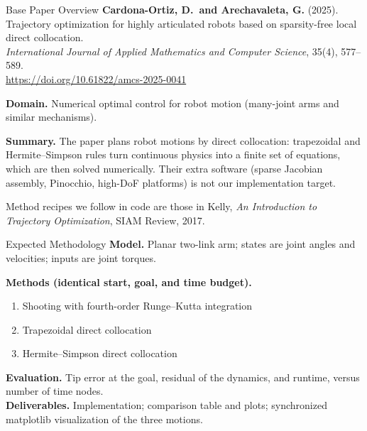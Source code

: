 \documentclass[10pt,aspectratio=169]{beamer}
\begin{document}
\begin{frame}{Base Paper Overview}
  \textbf{Cardona-Ortiz, D.\ and Arechavaleta, G.} (2025).\\
  Trajectory optimization for highly articulated robots based on sparsity-free local direct collocation.\\
  \emph{International Journal of Applied Mathematics and Computer Science}, 35(4), 577--589.\\
  \url{https://doi.org/10.61822/amcs-2025-0041}

  \vspace{0.4cm}
  \textbf{Domain.} Numerical optimal control for robot motion (many-joint arms and similar mechanisms).

  \vspace{0.3cm}
  \textbf{Summary.} The paper plans robot motions by direct collocation: trapezoidal and Hermite--Simpson rules turn continuous physics into a finite set of equations, which are then solved numerically. Their extra software (sparse Jacobian assembly, Pinocchio, high-DoF platforms) is not our implementation target.

  \vspace{0.3cm}
  {\small Method recipes we follow in code are those in Kelly, \emph{An Introduction to Trajectory Optimization}, SIAM Review, 2017.}
\end{frame}

\begin{frame}{Expected Methodology}
  \textbf{Model.} Planar two-link arm; states are joint angles and velocities; inputs are joint torques.

  \vspace{0.3cm}
  \textbf{Methods (identical start, goal, and time budget).}
  \begin{enumerate}
    \item Shooting with fourth-order Runge--Kutta integration
    \item Trapezoidal direct collocation
    \item Hermite--Simpson direct collocation
  \end{enumerate}

  \vspace{0.25cm}
  \textbf{Evaluation.} Tip error at the goal, residual of the dynamics, and runtime, versus number of time nodes.\\[0.35em]
  \textbf{Deliverables.} Implementation; comparison table and plots; synchronized matplotlib visualization of the three motions.
\end{frame}
\end{document}
